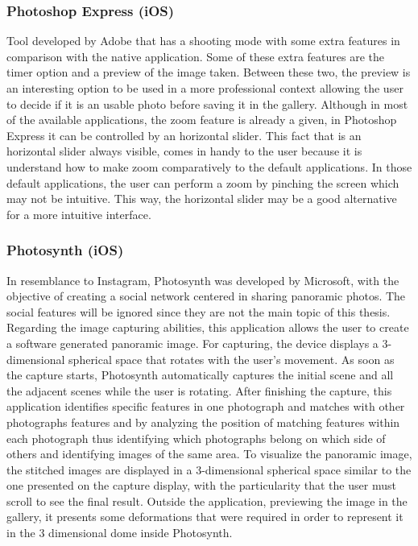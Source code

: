 \subsubsection{Photoshop Express (iOS)}

 Tool developed by Adobe that has a shooting mode with some extra features in comparison with the native application. Some of these extra features are the timer option and a preview of the image taken.
Between these two, the preview is an interesting option to be used in a more professional context allowing the user to decide if it is an usable photo before saving it in the gallery.
Although in most of the available applications, the zoom feature is already a given, in Photoshop Express it can be controlled by an horizontal slider. This fact that is an horizontal slider always visible, comes in handy to the user because it is understand how to make zoom comparatively to the default applications. 
In those default applications, the user can perform a zoom by pinching the screen which may not be intuitive. This way, the horizontal slider may be a good alternative for a more intuitive interface.

\subsubsection{Photosynth (iOS)}

 In resemblance to Instagram, Photosynth was developed by Microsoft, with the objective of creating a social network centered in sharing panoramic photos. The social features will be ignored since they are not the main topic of this thesis.
Regarding the image capturing abilities, this application allows the user to create a software generated panoramic image. For capturing, the device displays a 3-dimensional spherical space that rotates with the user’s movement. As soon as the capture starts, Photosynth automatically captures the initial scene and all the adjacent scenes while the user is rotating. After finishing the capture, this application identifies specific features in one photograph and matches with other photographs features and by analyzing the position of matching features within each photograph thus identifying which photographs belong on which side of others and identifying images of the same area. 
To visualize the panoramic image, the stitched images are displayed in a 3-dimensional spherical space similar to the one presented on the capture display, with the particularity that the user must scroll to see the final result. Outside the application, previewing the image in the gallery, it presents some deformations that were required in order to represent it in the 3 dimensional dome inside Photosynth.

